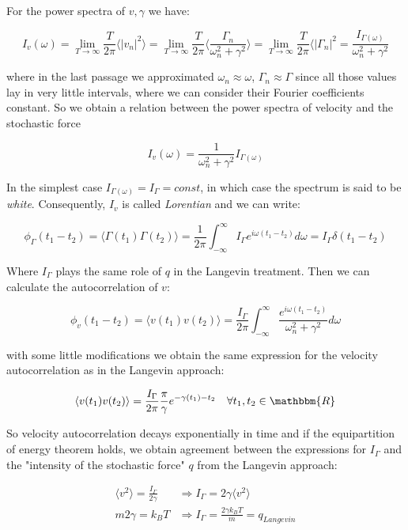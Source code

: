 \documentclass{article}
\begin{document}
For the power spectra of $v,\gamma$ we have:

$$ I_v(\omega) = \lim\limits_{T \to \infty} \frac{T}{2 \pi} \langle |v_n|^2 \rangle = \lim\limits_{T \to \infty} \frac{T}{2 \pi} \langle \frac{ \Gamma_n }{\omega_n^2 + \gamma^2} \rangle = \lim\limits_{T \to \infty}  \frac{T}{2 \pi} \langle |\Gamma_n|^2 =\frac{I_{\Gamma(\omega)}}{\omega_n^2 + \gamma^2}$$

where in the last passage we approximated $\omega_n \approx \omega$, $\Gamma_n \approx \Gamma$ since all those values lay in very little intervals, where we can consider their Fourier coefficients constant. So we obtain a relation between the power spectra of velocity and the stochastic force

\begin{equation}
I_v(\omega) = \frac{1}{\omega_n^2 + \gamma^2} I_{\Gamma(\omega)}
\end{equation}

In the simplest case $I_{\Gamma(\omega)} = I_{\Gamma} = \textit{const} $, in which case the spectrum is said to be \textit{white}. Consequently, $I_v$ is called \textit{Lorentian} and we can write:

$$ \phi_{\Gamma}(t_1 - t_2 ) = \langle \Gamma(t_1) \Gamma(t_2) \rangle = \frac{1}{2 \pi} \int_{- \infty}^{\infty } I_{\Gamma} e^{i \omega (t_1 - t_2)} d\omega = I_{\Gamma} \delta(t_1 - t_2)$$

Where $I_{\Gamma}$ plays the same role of $q$ in the Langevin treatment. Then we can calculate the autocorrelation of $v$:

$$ \phi_{v}(t_1 - t_2 ) = \langle v(t_1) v(t_2) \rangle = \frac{I_{\Gamma} }{2 \pi} \int_{- \infty}^{\infty } \frac{ e^{i \omega (t_1 - t_2)} }{\omega_n^2 + \gamma^2} d\omega $$

with some little modifications we obtain the same expression for the velocity autocorrelation as in the Langevin approach:

\begin{equation}
 \langle v(t_1) v(t_2) \rangle = \frac{ I_{\Gamma} }{2 \pi} \frac{\pi}{\gamma} e^{-\gamma(t_1)-t_2} \quad \forall t_1, t_2 \in \mathbbm{R}
\end{equation}

 So velocity autocorrelation decays exponentially in time and if the equipartition of energy theorem holds, we obtain agreement between the expressions for $I_{\Gamma}$ and the "intensity of the stochastic force" $q$ from the Langevin approach:
 
 \begin{align*}
\langle v^2 \rangle = \frac{ I_{\Gamma} }{ 2 \gamma} & \Rightarrow I_{\Gamma}  =2 \gamma \langle v^2 \rangle \\
m 2 \gamma = k_B T & \Rightarrow  I_{\Gamma}  = \frac{2 \gamma k_B T}{m} = q_{Langevin}\\
 \end{align*}
\end{document}
